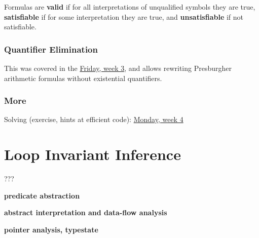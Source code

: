 \documentclass[a4paper,10pt]{article}
\begin{document}
Formulas are \textbf{valid} if for all interpretations of
unqualified symbols they are true, \textbf{satisfiable} if
for some interpretation they are true, and
\textbf{unsatisfiable} if not satisfiable.

\subsubsection{Quantifier Elimination}
This was covered in the \href{http://lara.epfl.ch/w/sav12:lab_03}{Friday,
week 3}, and allows rewriting Presburgher arithmetic formulas without
existential quantifiers.

\subsubsection{More}
Solving (exercise, hints at efficient code):
\href{http://lara.epfl.ch/w/sav12:calculating_solutions_of_pa_formulas}{Monday,
week 4} 



\section{Loop Invariant Inference}
???

\textbf{predicate abstraction}

\textbf{abstract interpretation and data-flow analysis}

\textbf{pointer analysis, typestate}


{}
\printindex
\end{document}
